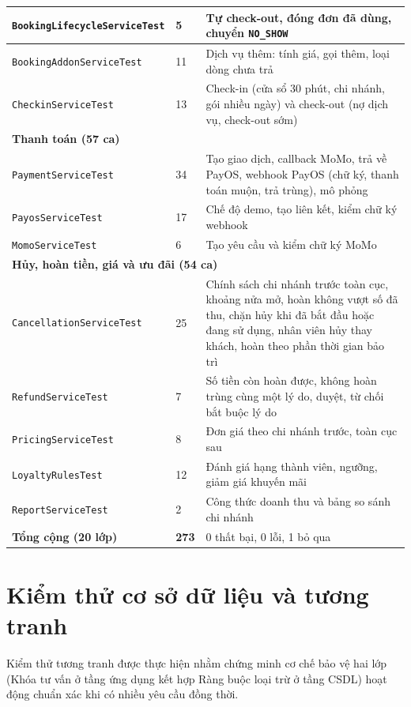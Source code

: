 \begin{table}[H]
\begin{tabular}{|p{5.7cm}|p{1.1cm}|p{7.0cm}|}
\hline
\texttt{BookingLifecycle\allowbreak ServiceTest} & 5 & Tự check-out, đóng đơn đã dùng, chuyển \texttt{NO\_SHOW} \\
\hline
\texttt{BookingAddonServiceTest} & 11 & Dịch vụ thêm: tính giá, gọi thêm, loại dòng chưa trả \\
\hline
\texttt{CheckinServiceTest} & 13 & Check-in (cửa sổ 30 phút, chi nhánh, gói nhiều ngày) và check-out (nợ dịch vụ, check-out sớm) \\
\hline
\multicolumn{3}{|l|}{\textbf{Thanh toán (57 ca)}} \\
\hline
\texttt{PaymentServiceTest} & 34 & Tạo giao dịch, callback MoMo, trả về PayOS, webhook PayOS (chữ ký, thanh toán muộn, trả trùng), mô phỏng \\
\hline
\texttt{PayosServiceTest} & 17 & Chế độ demo, tạo liên kết, kiểm chữ ký webhook \\
\hline
\texttt{MomoServiceTest} & 6 & Tạo yêu cầu và kiểm chữ ký MoMo \\
\hline
\multicolumn{3}{|l|}{\textbf{Hủy, hoàn tiền, giá và ưu đãi (54 ca)}} \\
\hline
\texttt{CancellationServiceTest} & 25 & Chính sách chi nhánh trước toàn cục, khoảng nửa mở, hoàn không vượt số đã thu, chặn hủy khi đã bắt đầu hoặc đang sử dụng, nhân viên hủy thay khách, hoàn theo phần thời gian bảo trì \\
\hline
\texttt{RefundServiceTest} & 7 & Số tiền còn hoàn được, không hoàn trùng cùng một lý do, duyệt, từ chối bắt buộc lý do \\
\hline
\texttt{PricingServiceTest} & 8 & Đơn giá theo chi nhánh trước, toàn cục sau \\
\hline
\texttt{LoyaltyRulesTest} & 12 & Đánh giá hạng thành viên, ngưỡng, giảm giá khuyến mãi \\
\hline
\texttt{ReportServiceTest} & 2 & Công thức doanh thu và bảng so sánh chi nhánh \\
\hline
\textbf{Tổng cộng (20 lớp)} & \textbf{273} & 0 thất bại, 0 lỗi, 1 bỏ qua \\
\hline
\end{tabular}
\end{table}

\section{Kiểm thử cơ sở dữ liệu và tương tranh}
\label{sec:kt_csdl}

Kiểm thử tương tranh được thực hiện nhằm chứng minh cơ chế bảo vệ hai lớp (Khóa tư vấn ở tầng ứng dụng kết hợp Ràng buộc loại trừ ở tầng CSDL) hoạt động chuẩn xác khi có nhiều yêu cầu đồng thời.

